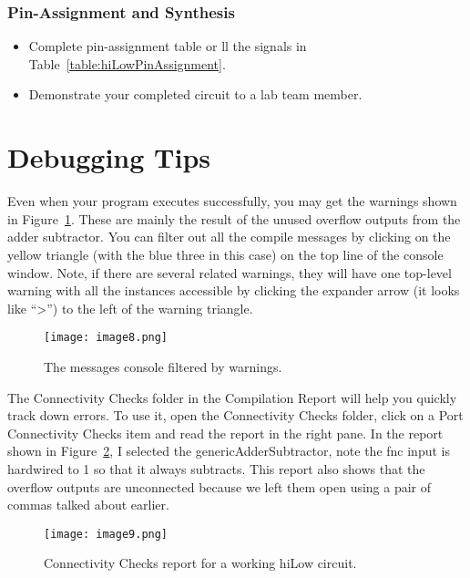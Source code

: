 \subsubsection{Pin-Assignment and Synthesis}
\begin{itemize}
\item Complete pin-assignment table or ll the signals in Table~\ref{table:hiLowPinAssignment}.
\item Demonstrate your completed circuit to a lab team member.
\end{itemize}

\section{Debugging Tips}
\label{section:hiLowHintDebugging}

Even when your program executes successfully, you may get the warnings shown in
Figure~\ref{fig:messageConsole}. These are mainly the result of the unused overflow outputs
from the adder subtractor. You can filter out all the compile messages
by clicking on the yellow triangle (with the blue three in this case) on
the top line of the console window. Note, if there are several related
warnings, they will have one top-level warning with all the instances
accessible by clicking the expander arrow (it looks like
``\textgreater'') to the left of the warning triangle.

\begin{figure}[ht]
\texttt{[image: image8.png]}
\caption{The messages console filtered by warnings.}
\label{fig:messageConsole}
\end{figure}

The Connectivity Checks folder in the Compilation Report will help
you quickly track down errors. To use it, open the Connectivity
Checks folder, click on a Port Connectivity Checks item and read the
report in the right pane. In the report shown in Figure~\ref{fig:connectivityCheck}, I selected
the genericAdderSubtractor, note the fnc input is hardwired to 1 so that it
always subtracts. This report also shows that the overflow outputs are
unconnected because we left them open using a pair of commas talked
about earlier.

\begin{figure}[ht]
\texttt{[image:  image9.png]}
\caption{Connectivity Checks report for a working hiLow circuit.}
\label{fig:connectivityCheck}
\end{figure}

